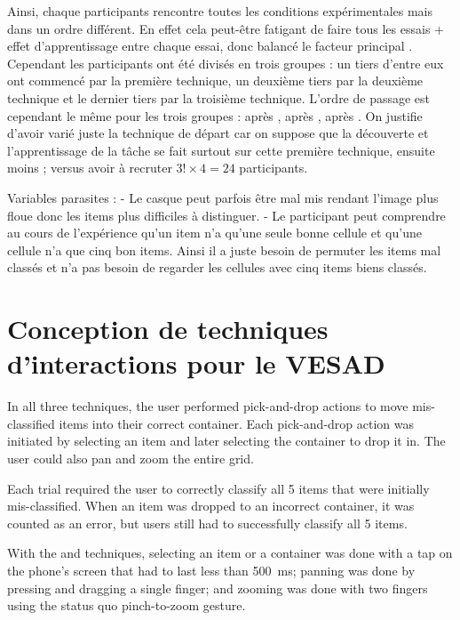 Ainsi, chaque participants rencontre toutes les conditions expérimentales mais dans un ordre différent. En effet cela peut-être fatigant de faire tous les essais + effet d'apprentissage entre chaque essai, donc balancé le facteur principal . Cependant les participants ont été divisés en trois groupes : un tiers d'entre eux ont commencé par la première technique, un deuxième tiers par la deuxième technique et le dernier tiers par la troisième technique. L'ordre de passage est cependant le même pour les trois groupes :  après ,  après ,  après . On justifie d'avoir varié juste la technique de départ car on suppose que la découverte et l'apprentissage de la tâche se fait surtout sur cette première technique, ensuite moins ; versus avoir à recruter $3! \times 4 = 24$ participants.

Variables parasites : 
- Le casque peut parfois être mal mis rendant l'image plus floue donc les items plus difficiles à distinguer.
- Le participant peut comprendre au cours de l'expérience qu'un item n'a qu'une seule bonne cellule et qu'une cellule n'a que cinq bon items. Ainsi il a juste besoin de permuter les items mal classés et n'a pas besoin de regarder les cellules avec cinq items biens classés.


\section{Conception de techniques d'interactions pour le VESAD}
\label{sec:experiment_interaction_techniques}

In all three techniques, the user performed pick-and-drop actions to move mis-classified items into their correct container. Each pick-and-drop action was initiated by selecting an item and later selecting the container to drop it in. The user could also pan and zoom the entire grid.

Each trial required the user to correctly classify all 5 items that were initially mis-classified. When an item was dropped to an incorrect container, it was counted as an error, but users still had to successfully classify all 5 items.

With the  and  techniques, selecting an item or a container was done with a tap on the phone's screen that had to last less than \SI{500}{\ms}; panning was done by pressing and dragging a single finger; and zooming was done with two fingers using the status quo pinch-to-zoom gesture.


